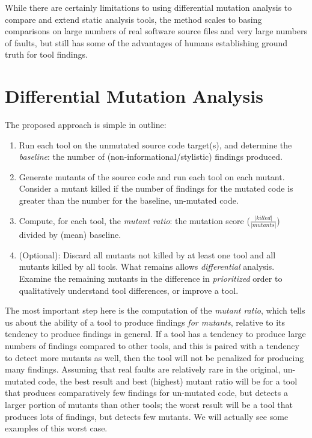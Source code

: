  While there are certainly limitations to using differential mutation analysis to compare and extend static analysis tools, the method scales to basing comparisons on large numbers of real software source files and very large numbers of faults, but still has some of the advantages of humans establishing ground truth for tool findings.

 \section{Differential Mutation Analysis}
 \label{sec:method}

The proposed approach is simple in outline:

\begin{enumerate}
\item Run each tool on the unmutated source code target(s), and determine the \emph{baseline}: the number of (non-informational/stylistic) findings produced.
\item Generate mutants of the source code and run each tool on each mutant.  Consider a mutant killed if the number of findings for the mutated code is greater than the number for the baseline, un-mutated code.
\item Compute, for each tool, the \emph{mutant ratio}:  the mutation score ($\frac{|\mathit{killed}|}{|\mathit{mutants}|}$) divided by (mean) baseline.
\item (Optional): Discard all mutants not killed by at least one tool and all mutants killed by all tools.  What remains allows \emph{differential} analysis.
Examine the remaining mutants in the difference in \emph{prioritized} order to qualitatively understand tool differences, or improve a tool.
\end{enumerate}

The most important step here is the computation of the \emph{mutant ratio}, which tells us about the ability of a tool to produce findings \emph{for mutants}, relative to its tendency to produce findings in general.  If a tool has a tendency to produce large numbers of findings compared to other tools, and this is paired with a tendency to detect more mutants as well, then the tool will not be penalized for producing many findings.  Assuming that real faults are relatively rare in the original, un-mutated code, the best result and best (highest) mutant ratio will be for a tool that produces comparatively few findings for un-mutated code, but detects a larger portion of mutants than other tools; the worst result will be a tool that produces lots of findings, but detects few mutants.  We will actually see some examples of this worst case.

